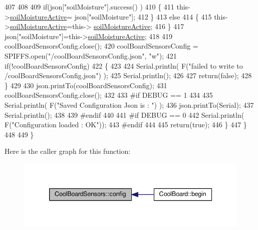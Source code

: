 \begin{DoxyCode}
407 
408             
409             \textcolor{keywordflow}{if}(json[\textcolor{stringliteral}{"soilMoisture"}].success() )
410             \{           
411                 this->\hyperlink{class_cool_board_sensors_ae7971bf527781ac4994309591b78ab89}{soilMoistureActive}= json[\textcolor{stringliteral}{"soilMoisture"}];
412             \}
413             \textcolor{keywordflow}{else}
414             \{
415                 this->\hyperlink{class_cool_board_sensors_ae7971bf527781ac4994309591b78ab89}{soilMoistureActive}=this->
      \hyperlink{class_cool_board_sensors_ae7971bf527781ac4994309591b78ab89}{soilMoistureActive};
416             \}
417             json[\textcolor{stringliteral}{"soilMoisture"}]=this->\hyperlink{class_cool_board_sensors_ae7971bf527781ac4994309591b78ab89}{soilMoistureActive};
418 
419             coolBoardSensorsConfig.close();         
420             coolBoardSensorsConfig = SPIFFS.open(\textcolor{stringliteral}{"/coolBoardSensorsConfig.json"}, \textcolor{stringliteral}{"w"});          
421             \textcolor{keywordflow}{if}(!coolBoardSensorsConfig)
422             \{
423 
424                 Serial.println( F(\textcolor{stringliteral}{"failed to write to /coolBoardSensorsConfig.json"}) );
425                 Serial.println();
426 
427                 \textcolor{keywordflow}{return}(\textcolor{keyword}{false});          
428             \}  
429 
430             json.printTo(coolBoardSensorsConfig);
431             coolBoardSensorsConfig.close();         
432             
433 \textcolor{preprocessor}{        #if DEBUG == 1}
434 
435             Serial.println( F(\textcolor{stringliteral}{"Saved Configuration Json is : "}) );
436             json.printTo(Serial);
437             Serial.println();
438         
439 \textcolor{preprocessor}{        #endif}
440 
441 \textcolor{preprocessor}{        #if DEBUG == 0}
442             Serial.println( F(\textcolor{stringliteral}{"Configuration loaded : OK"}));
443 \textcolor{preprocessor}{        #endif}
444 
445             \textcolor{keywordflow}{return}(\textcolor{keyword}{true}); 
446         \}
447     \}   
448 
449 \}
\end{DoxyCode}
Here is the caller graph for this function\+:\nopagebreak
\begin{figure}[H]
\begin{center}
\leavevmode
\includegraphics[width=339pt]{de/d46/class_cool_board_sensors_a9a218895c5423375c33c08f2c56fb23a_icgraph}
\end{center}
\end{figure}
\mbox{\label{class_cool_board_sensors_a4902b69f6e628bd6557193758fdd2bae}} 
